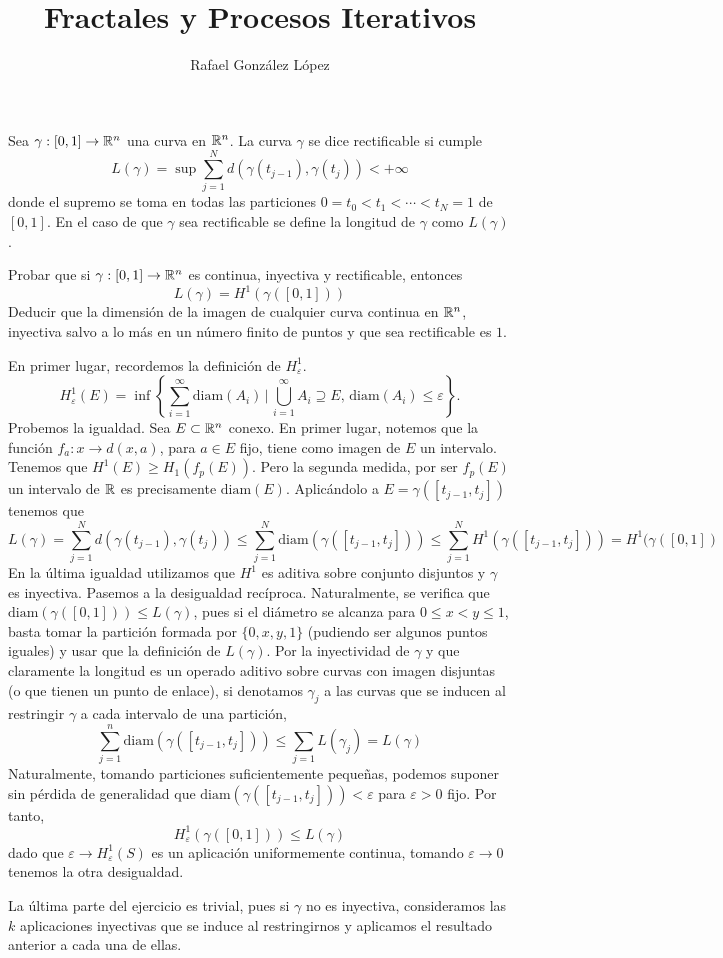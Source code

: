 \documentclass[twoside]{article}
\begin{document}
\title{Fractales y Procesos Iterativos}
\author{Rafael González López}
\maketitle

\begin{ejercicio}{3}
Sea $\gamma:[0,1]\to \mathbb{R}^n$ una curva en $\mathbb{R}^n$. La curva $\gamma$ se dice rectificable si cumple
$$
L(\gamma) = \sup \sum_{j=1}^N d(\gamma(t_{j-1}),\gamma(t_j)) < +\infty
$$
donde el supremo se toma en todas las particiones $0 = t_0 < t_1< \cdots< t_N = 1$ de $[0,1]$. En el caso de que $\gamma$ sea rectificable se define la longitud de $\gamma$ como $L(\gamma)$. 

Probar que si $\gamma:[0,1]\to \mathbb{R}^n$ es continua, inyectiva y rectificable, entonces
$$
L(\gamma) = H^1(\gamma([0,1]))
$$
Deducir que la dimensión de la imagen de cualquier curva continua en $\mathbb{R}^n$, inyectiva salvo a lo más en un número finito de puntos y que sea rectificable es $1$.
\end{ejercicio}
\begin{solucion}
En primer lugar, recordemos la definición de $H^1_\varepsilon$.
$$
H^1_\varepsilon(E) = \inf\left\{\sum\limits_{i=1}^\infty\text{diam}(A_i)\,\bigg|\,\bigcup\limits_{i=1}^\infty A_i \supseteq E,\,\text{diam}(A_i)\leq \varepsilon\right\}.
$$
Probemos la igualdad. Sea $E\subset \mathbb{R}^n$ conexo. En primer lugar, notemos que la función $f_a:x\to d(x,a)$, para $a\in E$ fijo, tiene como imagen de $E$ un intervalo. Tenemos que $H^1(E)\geq H_1(f_p(E))$. Pero la segunda medida, por ser $f_p(E)$ un intervalo de $\mathbb{R}$ es precisamente $\text{diam}(E)$. Aplicándolo a $E = \gamma([t_{j-1},t_j])$ tenemos que
$$
L(\gamma) = \sum_{j=1}^N d(\gamma(t_{j-1}),\gamma(t_j)) \leq \sum_{j=1}^N \text{diam}(\gamma([t_{j-1},t_j])) \leq \sum_{j=1}^N H^1(\gamma([t_{j-1},t_j])) = H^1(\gamma([0,1])
$$
En la última igualdad utilizamos que $H^1$ es aditiva sobre conjunto disjuntos y $\gamma$ es inyectiva.
\newpage
Pasemos a la desigualdad recíproca. Naturalmente, se verifica que $\text{diam}(\gamma([0,1])) \leq L(\gamma)$, pues si el diámetro se alcanza para $0\leq x < y\leq 1$, basta tomar la partición formada por $\{0,x,y,1\}$ (pudiendo ser algunos puntos iguales) y usar que la definición de $L(\gamma)$. Por la inyectividad de $\gamma$ y que claramente la longitud es un operado aditivo sobre curvas con imagen disjuntas (o que tienen un punto de enlace), si denotamos $\gamma_j$ a las curvas que se inducen al restringir $\gamma$ a cada intervalo de una partición,
$$
\sum_{j=1}^n \text{diam}(\gamma([t_{j-1},t_j])) \leq \sum_{j=1} L(\gamma_j) = L(\gamma)
$$
Naturalmente, tomando particiones suficientemente pequeñas, podemos suponer sin pérdida de generalidad que $\text{diam}(\gamma([t_{j-1},t_j]))<\varepsilon$ para $\varepsilon>0$ fijo. Por tanto, 
$$
H^1_\varepsilon(\gamma([0,1])) \leq L(\gamma)
$$
dado que $\varepsilon \to H^1_\varepsilon(S)$ es un aplicación uniformemente continua, tomando $\varepsilon\to 0$ tenemos la otra desigualdad.

La última parte del ejercicio es trivial, pues si $\gamma$ no es inyectiva, consideramos las $k$ aplicaciones inyectivas que se induce al restringirnos y aplicamos el resultado anterior a cada una de ellas.
\end{solucion}
\end{document}
